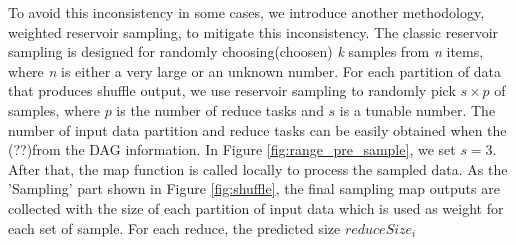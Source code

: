 To avoid this inconsistency in some cases, we introduce another methodology, weighted reservoir sampling, to mitigate this inconsistency. The classic reservoir sampling is designed for randomly choosing(choosen) \textit{k} samples from \textit{n} items, where \textit{n} is either a very large or an unknown number\cite{reservoir}. For each partition of data that produces shuffle output, we use reservoir sampling to randomly pick $s \times p$ of samples, where $p$ is the number of reduce tasks and $s$ is a tunable number. The number of input data partition and reduce tasks can be easily obtained when the (??)from the DAG information. In Figure \ref{fig:range_pre_sample}, we set $s = 3$. After that, the map function is called locally to process the sampled data. As the 'Sampling' part shown in Figure \ref{fig:shuffle}, the final sampling map outputs are collected with the size of each partition of input data which is used as weight for each set of sample. For each reduce, the predicted size $reduceSize_i$

